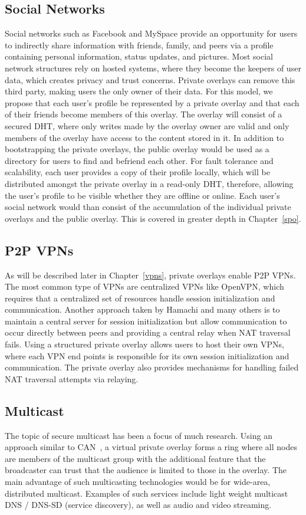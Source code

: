 \subsection{Social Networks}
Social networks such as Facebook and MySpace provide an opportunity for users to
indirectly share information with friends, family, and peers via a profile
containing personal information, status updates, and pictures.
Most social network structures rely on hosted systems, where they become
the keepers of user data, which creates privacy and trust concerns.  Private overlays
can remove this third party, making users the only owner of their data.  For this
model, we propose that each user's profile be represented by a private overlay
and that each of their friends become members of this overlay.  The overlay will
consist of a secured DHT, where only writes made by the overlay owner are valid
and only members of the overlay have access to the content stored in it.  In
addition to bootstrapping the private overlays, the public overlay would be
used as a directory for users to find and befriend each other.  For fault
tolerance and scalability, each user provides a copy of their profile
locally, which will be distributed amongst the private overlay in a read-only
DHT, therefore, allowing the user's profile to be visible whether they are
offline or online.  Each user's social network would than consist of the
accumulation of the individual private overlays and the public overlay.
This is covered in greater depth in Chapter~\ref{spo}.

\subsection{P2P VPNs}
As will be described later in Chapter~\ref{vpns}, private overlays enable P2P
VPNs.  The most common type of VPNs are centralized VPNs like OpenVPN, which
requires that a centralized set of resources handle session initialization and
communication.  Another approach taken by Hamachi and many others is to
maintain a central server for session initialization but allow communication to
occur directly between peers and providing a central relay when NAT traversal
fails.  Using a structured private overlay allows users to host their own
VPNs, where each VPN end points is responsible for its own session
initialization and communication.  The private overlay also provides mechanisms
for handling failed NAT traversal attempts via relaying.

\subsection{Multicast}
The topic of secure multicast has been a focus of much research.  Using an
approach similar to CAN~\cite{can_multicast}, a virtual private overlay forms
a ring where all nodes are members of the multicast group with the additional
feature that the broadcaster can trust that the audience is limited to those
in the overlay.  The main advantage of such multicasting technologies would be
for wide-area, distributed multicast.  Examples of such services include light
weight multicast DNS / DNS-SD (service discovery), as well as audio and video
streaming.

